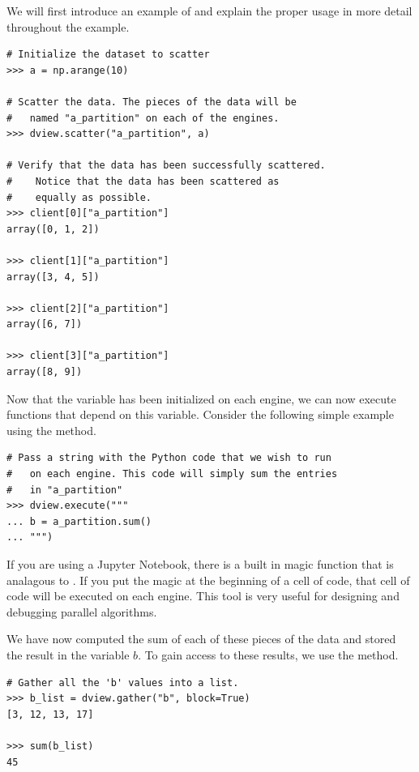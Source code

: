 We will first introduce an example of  and explain the proper usage in more detail throughout the example.

\begin{lstlisting}
# Initialize the dataset to scatter
>>> a = np.arange(10)

# Scatter the data. The pieces of the data will be
#   named "a_partition" on each of the engines.
>>> dview.scatter("a_partition", a)

# Verify that the data has been successfully scattered.
#    Notice that the data has been scattered as
#    equally as possible.
>>> client[0]["a_partition"]
array([0, 1, 2])

>>> client[1]["a_partition"]
array([3, 4, 5])

>>> client[2]["a_partition"]
array([6, 7])

>>> client[3]["a_partition"]
array([8, 9])
\end{lstlisting}

Now that the  variable has been initialized on each engine, we can now execute functions that depend on this variable.
Consider the following simple example using the  method.

\begin{lstlisting}
# Pass a string with the Python code that we wish to run
#   on each engine. This code will simply sum the entries
#   in "a_partition"
>>> dview.execute("""
... b = a_partition.sum()
... """)
\end{lstlisting}


\begin{info}
If you are using a Jupyter Notebook, there is a built in magic function that is analagous to .
If you put the  magic at the beginning of a cell of code, that cell of code will be executed on each engine. 
This tool is very useful for designing and debugging parallel algorithms.
\end{info}


We have now computed the sum of each of these pieces of the data and stored the result in the variable $b$. 
To gain access to these results, we use the  method.

\begin{lstlisting}
# Gather all the 'b' values into a list.
>>> b_list = dview.gather("b", block=True)
[3, 12, 13, 17]

>>> sum(b_list)
45
\end{lstlisting}

